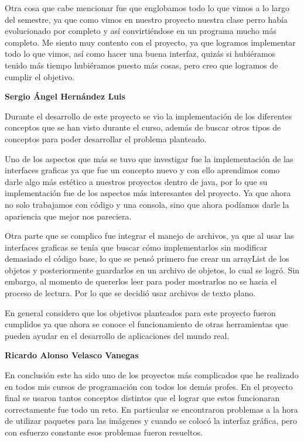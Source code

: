 \documentclass[12pt,a4paper]{report}
\begin{document}
{Otra cosa que cabe mencionar fue que englobamos todo lo que vimos a lo largo del semestre, ya que como vimos en nuestro proyecto nuestra   clase perro había evolucionado por completo y así convirtiéndose en un programa mucho más completo. Me siento muy contento con el proyecto, ya que logramos implementar todo lo que vimos, así como hacer una buena interfaz, quizás si hubiéramos tenido más tiempo hubiéramos puesto más cosas, pero creo que logramos de cumplir el objetivo.
\bigskip 

\textbf{Sergio Ángel Hernández Luis}
\bigskip 

Durante el desarrollo de este proyecto se vio la implementación de los diferentes conceptos que se han visto durante el curso, además de buscar otros tipos de conceptos para poder desarrollar el problema planteado.
\medskip 

Uno de los aspectos que más se tuvo que investigar fue la implementación de las interfaces graficas ya que fue un concepto nuevo y con ello aprendimos como darle algo más estético a nuestros proyectos dentro de java, por lo que su implementación fue de los aspectos más interesantes del proyecto. Ya que ahora no solo trabajamos con código y una consola, sino que ahora podíamos darle la apariencia que mejor nos pareciera.
\medskip 

Otra parte que se complico fue integrar el manejo de archivos, ya que al usar las interfaces graficas se tenía que buscar cómo implementarlos sin modificar demasiado el código base, lo que se pensó primero fue crear un arrayList de los objetos y posteriormente guardarlos en un archivo de objetos, lo cual se logró. Sin embargo, al momento de quererlos leer para poder mostrarlos no se hacia el proceso de lectura. Por lo que se decidió usar archivos de texto plano.
\medskip 

En general considero que los objetivos planteados para este proyecto fueron cumplidos ya que ahora se conoce el funcionamiento de otras herramientas que pueden ayudar en el desarrollo de aplicaciones del mundo real.
\bigskip 

\textbf{Ricardo Alonso Velasco Vanegas}
\bigskip 

En conclusión este ha sido uno de los proyectos más complicados que he realizado en todos mis cursos de programación con todos los demás profes. En el proyecto final se usaron tantos conceptos distintos que el lograr que estos funcionaran correctamente fue todo un reto. En particular se encontraron problemas a la hora de utilizar paquetes para las imágenes y cuando se colocó la interfaz gráfica, pero con esfuerzo constante esos problemas fueron resueltos.
\medskip 

}
\end{document}
